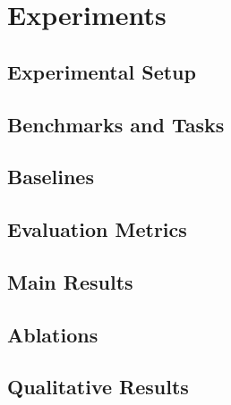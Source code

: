 \section{Experiments}

\subsection{Experimental Setup}

\subsection{Benchmarks and Tasks}

\subsection{Baselines}

\subsection{Evaluation Metrics}

\subsection{Main Results}

\subsection{Ablations}

\subsection{Qualitative Results}
